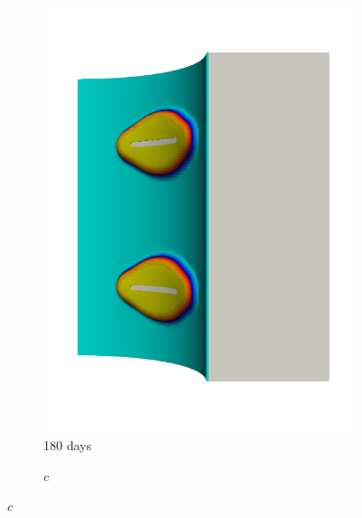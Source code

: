 \begin{figure}[!htb]
\begin{subfigure}[b]{0.2\textwidth}
    \includegraphics[width=\textwidth]{Chapter5/figures/spallation/seed_c_4}
    \caption{180 days}
  \end{subfigure}
  \begin{subfigure}[b]{0.1\textwidth}
    \centering
    \caption*{$c$}

\end{subfigure}
\end{figure}
